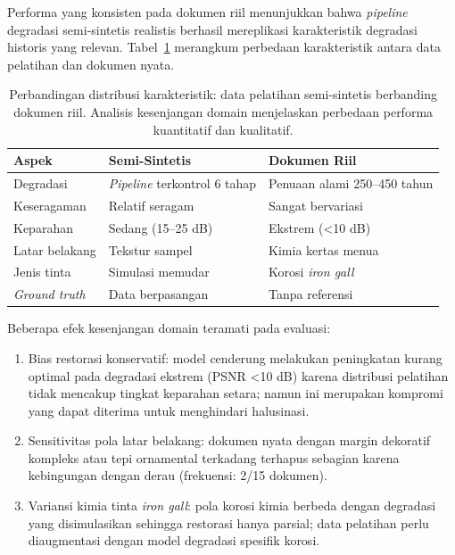 Performa yang konsisten pada dokumen riil menunjukkan bahwa \textit{pipeline} degradasi semi-sintetis realistis berhasil mereplikasi karakteristik degradasi historis yang relevan. Tabel~\ref{table:synthetic_vs_real_comparison} merangkum perbedaan karakteristik antara data pelatihan dan dokumen nyata.

\begin{table}[!t]
    \renewcommand{\arraystretch}{1.15}
    \caption[Kesenjangan domain pelatihan-riil]{Perbandingan distribusi karakteristik: data pelatihan semi-sintetis berbanding dokumen riil. Analisis kesenjangan domain menjelaskan perbedaan performa kuantitatif dan kualitatif.}
    \label{table:synthetic_vs_real_comparison}
    \begin{tabularx}{\textwidth}{|>{\raggedright\arraybackslash}l|>{\raggedright\arraybackslash}X|>{\raggedright\arraybackslash}X|}
        \hline
        \textbf{Aspek} & \textbf{Semi-Sintetis} & \textbf{Dokumen Riil} \\
        \hline
        Degradasi             & \textit{Pipeline} terkontrol 6 tahap & Penuaan alami 250--450 tahun \\
        \hline
        Keseragaman           & Relatif seragam              & Sangat bervariasi         \\
        \hline
        Keparahan             & Sedang (15--25 dB)           & Ekstrem (<10 dB)          \\
        \hline
        Latar belakang        & Tekstur sampel               & Kimia kertas menua        \\
        \hline
        Jenis tinta           & Simulasi memudar             & Korosi \textit{iron gall} \\
        \hline
        \textit{Ground truth} & Data berpasangan             & Tanpa referensi           \\
        \hline
    \end{tabularx}
\end{table}

Beberapa efek kesenjangan domain teramati pada evaluasi:
\begin{enumerate}[leftmargin=1.5em, labelsep=0.5em, itemindent=0pt, noitemsep, topsep=0pt]
    \item Bias restorasi konservatif: model cenderung melakukan peningkatan kurang optimal pada degradasi ekstrem (PSNR <10 dB) karena distribusi pelatihan tidak mencakup tingkat keparahan setara; namun ini merupakan kompromi yang dapat diterima untuk menghindari halusinasi.

    \item Sensitivitas pola latar belakang: dokumen nyata dengan margin dekoratif kompleks atau tepi ornamental terkadang terhapus sebagian karena kebingungan dengan derau (frekuensi: 2/15 dokumen).

    \item Variansi kimia tinta \textit{iron gall}: pola korosi kimia berbeda dengan degradasi yang disimulasikan sehingga restorasi hanya parsial; data pelatihan perlu diaugmentasi dengan model degradasi spesifik korosi.
\end{enumerate}

